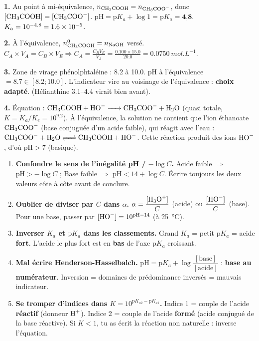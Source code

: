 \documentclass[11pt]{article}
\begin{document}
\begin{corrige}
\textbf{1.} Au point à mi-équivalence, $n_{\ce{CH3COOH}} = n_{\ce{CH3COO-}}$, donc $[\ce{CH3COOH}] = [\ce{CH3COO-}]$.
$\mathrm{pH} = \mathrm{p}K_a + \log 1 = \mathrm{p}K_a = \textbf{4,8}$.
$K_a = 10^{-\num{4,8}} = \textbf{\num{1,6e-5}}$.

\textbf{2.} À l'équivalence, $n_{\ce{CH3COOH}}^0 = n_{\ce{NaOH}}$ versé.
$C_A \times V_A = C_B \times V_E \Rightarrow C_A = \frac{C_B V_E}{V_A} = \frac{\num{0,100} \times \num{15,0}}{\num{20,0}} = \SI{0,0750}{mol.L^{-1}}$.

\textbf{3.} Zone de virage phénolphtaléine : \num{8,2} à \num{10,0}. pH à l'équivalence $= \num{8,7} \in [\num{8,2}; \num{10,0}]$. L'indicateur vire au voisinage de l'équivalence : \textbf{choix adapté}. (Hélianthine \num{3,1}--\num{4,4} virait bien avant).

\textbf{4.} Équation : $\ce{CH3COOH + HO- -> CH3COO- + H2O}$ (quasi totale, $K = K_a/K_e = 10^{\num{9,2}}$).
À l'équivalence, la solution ne contient que l'ion éthanoate $\ce{CH3COO-}$ (base conjuguée d'un acide faible), qui réagit avec l'eau : $\ce{CH3COO- + H2O <=> CH3COOH + HO-}$. Cette réaction produit des ions $\ce{HO-}$, d'où $\mathrm{pH} > 7$ (basique).
\end{corrige}

\begin{attention}
\begin{enumerate}
\item \textbf{Confondre le sens de l'inégalité pH / $-\log C$.} Acide faible $\Rightarrow$ $\mathrm{pH} > -\log C$ ; Base faible $\Rightarrow$ $\mathrm{pH} < 14 + \log C$. Écrire toujours les deux valeurs côte à côte avant de conclure.
\item \textbf{Oublier de diviser par $C$ dans $\alpha$.} $\alpha = \dfrac{[\ce{H3O+}]}{C}$ (acide) ou $\dfrac{[\ce{HO-}]}{C}$ (base). Pour une base, passer par $[\ce{HO-}] = 10^{\mathrm{pH}-14}$ (à \SI{25}{\celsius}).
\item \textbf{Inverser $K_a$ et $\mathrm{p}K_a$ dans les classements.} Grand $K_a$ = petit $\mathrm{p}K_a$ = acide \textbf{fort}. L'acide le plus fort est en \textbf{bas} de l'axe $\mathrm{p}K_a$ croissant.
\item \textbf{Mal écrire Henderson-Hasselbalch.} $\mathrm{pH} = \mathrm{p}K_a + \log\dfrac{[\text{base}]}{[\text{acide}]}$ : \textbf{base au numérateur}. Inversion = domaines de prédominance inversés = mauvais indicateur.
\item \textbf{Se tromper d'indices dans $K = 10^{\mathrm{p}K_{a2}-\mathrm{p}K_{a1}}$.} Indice 1 = couple de l'acide \textbf{réactif} (donneur $\ce{H+}$). Indice 2 = couple de l'acide \textbf{formé} (acide conjugué de la base réactive). Si $K < 1$, tu as écrit la réaction non naturelle : inverse l'équation.
\end{enumerate}
\end{attention}
\end{document}
